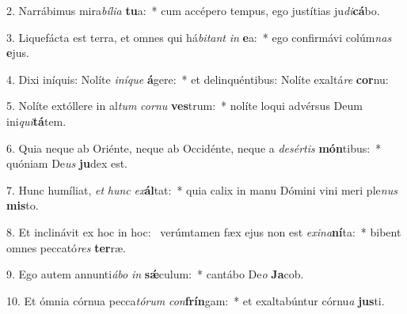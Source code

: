 2. Narrábimus mira\textit{bí}\textit{li}\textit{a} \textbf{tu}a:~*  cum accépero tempus, ego justítias ju\textit{di}\textbf{cá}bo.\

3. Liquefácta est terra, et omnes qui há\textit{bi}\textit{tant} \textit{in} \textbf{e}a:~*  ego confirmávi colúm\textit{nas} \textbf{e}jus.\

4. Dixi iníquis: Nolíte \textit{in}\textit{í}\textit{que} \textbf{á}gere:~*  et delinquéntibus: Nolíte exaltá\textit{re} \textbf{cor}nu:\

5. Nolíte extóllere in al\textit{tum} \textit{cor}\textit{nu} \textbf{ves}trum:~*  nolíte loqui advérsus Deum ini\textit{qui}\textbf{tá}tem.\

6. Quia neque ab Oriénte, neque ab Occidénte, neque a \textit{de}\textit{sér}\textit{tis} \textbf{món}tibus:~*  quóniam De\textit{us} \textbf{ju}dex est.\

7. Hunc humíliat, \textit{et} \textit{hunc} \textit{ex}\textbf{ál}tat:~*  quia calix in manu Dómini vini meri ple\textit{nus} \textbf{mis}to.\

8. Et inclinávit ex hoc in hoc: \dag\  verúmtamen fæx ejus non est \textit{ex}\textit{i}\textit{na}\textbf{ní}ta:~*  bibent omnes peccató\textit{res} \textbf{ter}ræ.\

9. Ego autem annunti\textit{á}\textit{bo} \textit{in} \textbf{sǽ}culum:~*  cantábo De\textit{o} \textbf{Ja}cob.\

10. Et ómnia córnua pecca\textit{tó}\textit{rum} \textit{con}\textbf{frín}gam:~*  et exaltabúntur córnu\textit{a} \textbf{jus}ti.\

